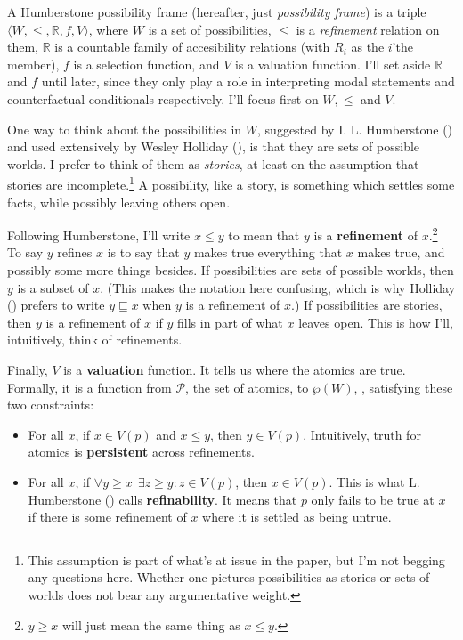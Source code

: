 \documentclass[
  11pt,
  letterpaper,
  DIV=11,
  numbers=noendperiod,
  twoside]{scrartcl}
\providecommand{\tightlist}{%
  \setlength{\itemsep}{0pt}\setlength{\parskip}{0pt}}
\begin{document}
A Humberstone possibility frame (hereafter, just \emph{possibility
frame}) is a triple \(\langle W, \leqslant, \mathbb{R}, f, V\rangle\),
where \(W\) is a set of possibilities, \(\leqslant\) is a
\emph{refinement} relation on them, \(\mathbb{R}\) is a countable family
of accesibility relations (with \(R_i\) as the \(i\)'the member), \(f\)
is a selection function, and \(V\) is a valuation function. I'll set
aside \(\mathbb{R}\) and \(f\) until later, since they only play a role
in interpreting modal statements and counterfactual conditionals
respectively. I'll focus first on \(W, \leqslant\) and \(V\).

One way to think about the possibilities in \(W\), suggested by I. L.
Humberstone () and used extensively
by Wesley Holliday (), is that they are
sets of possible worlds. I prefer to think of them as \emph{stories}, at
least on the assumption that stories are incomplete.\footnote{This
  assumption is part of what's at issue in the paper, but I'm not
  begging any questions here. Whether one pictures possibilities as
  stories or sets of worlds does not bear any argumentative weight.} A
possibility, like a story, is something which settles some facts, while
possibly leaving others open.

Following Humberstone, I'll write \(x \leqslant y\) to mean that \(y\)
is a \textbf{refinement} of \(x\).\footnote{\(y \geqslant x\) will just
  mean the same thing as \(x \leqslant y\).} To say \(y\) refines \(x\)
is to say that \(y\) makes true everything that \(x\) makes true, and
possibly some more things besides. If possibilities are sets of possible
worlds, then \(y\) is a subset of \(x\). (This makes the notation here
confusing, which is why Holliday ()
prefers to write \(y \sqsubseteq x\) when \(y\) is a refinement of
\(x\).) If possibilities are stories, then \(y\) is a refinement of
\(x\) if \(y\) fills in part of what \(x\) leaves open. This is how
I'll, intuitively, think of refinements.

Finally, \(V\) is a \textbf{valuation} function. It tells us where the
atomics are true. Formally, it is a function from \(\mathcal{P}\), the
set of atomics, to \(\wp(W)\), , satisfying these two constraints:

\begin{itemize}
\tightlist
\item
  For all \(x\), if \(x \in V(p)\) and \(x \leqslant y\), then
  \(y \in V(p)\). Intuitively, truth for atomics is \textbf{persistent}
  across refinements.
\item
  For all \(x\), if
  \(\forall y \geqslant x\;\, \exists z \geqslant y: z \in V(p)\), then
  \(x \in V(p)\). This is what L. Humberstone
  () calls
  \textbf{refinability}. It means that \(p\) only fails to be true at
  \(x\) if there is some refinement of \(x\) where it is settled as
  being untrue.
\end{itemize}
\end{document}
